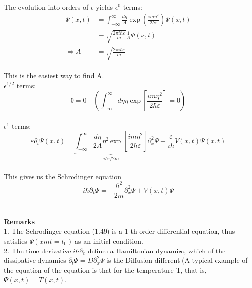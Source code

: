 \\
The evolution into orders of $\epsilon$ yields
$\epsilon^0$ terms:
\\
\begin{equation}
\begin{aligned} \Psi(x, t) &=\int_{-\infty}^{\infty} \frac{d \eta}{A} \exp \left(\frac{i m \eta^{2}}{2 \hbar \varepsilon}\right) \Psi(x, t) \\ &=\sqrt{\frac{2 \pi i \hbar \varepsilon}{m}} \frac{1}{A} \Psi(x, t) \\ \Rightarrow A &=\sqrt{\frac{2 \pi i \hbar \varepsilon}{m}} \end{aligned}
\end{equation}\\
This is the easiest way to find A.\\
$\epsilon^{1/2}$ terms:
\\
\begin{equation}
0=0 \quad\left(\int_{-\infty}^{\infty} d \eta \eta \exp \left[\frac{i m \eta^{2}}{2 \hbar \varepsilon}\right]=0\right)
\end{equation}\\
$\epsilon^1$ terms:
\\
\begin{equation}
\varepsilon \partial_{t} \Psi(x, t)=\underbrace{\int_{-\infty}^{\infty} \frac{d \eta}{2 A} \eta^{2} \exp \left[\frac{i m \eta^{2}}{2 \hbar \varepsilon}\right]}_{i \hbar \varepsilon / 2 m} \partial_{x}^{2} \Psi+\frac{\varepsilon}{i \hbar} V(x, t) \Psi(x, t)
\end{equation}\\
This gives us the Schrodinger equation
\\
\begin{equation}
i \hbar \partial_{t} \Psi=-\frac{\hbar^{2}}{2 m} \partial_{x}^{2} \Psi+V(x, t) \Psi
\end{equation}\\
\\\textbf{Remarks}\\
1. The Schrodinger equation (1.49) is a 1-th order differential equation, thus satisfies $\Psi(xm t = t_0)$ as an initial condition.\\
2. The time derivative $i\hbar \partial_t$ defines a Hamiltonian dynamics, which of the dissipative dynamics $\partial_t \Psi=D\partial^2_x\Psi$ is the Diffusion different (A typical example of the equation of the equation is that for the temperature T, that is, $\Psi(x, t) = T (x, t)$.\\
